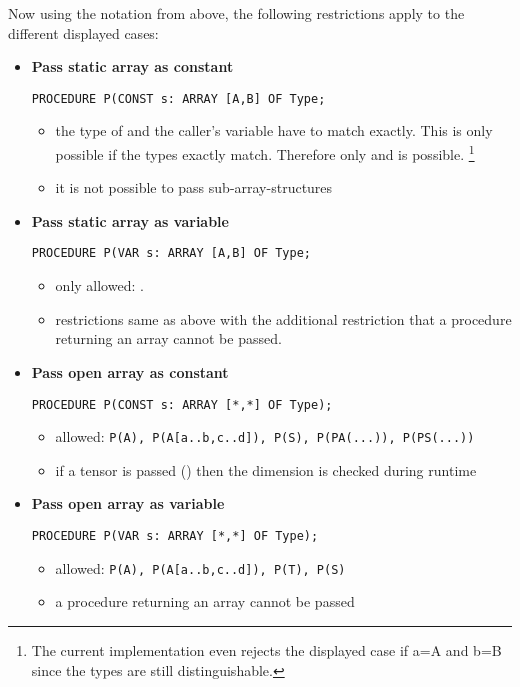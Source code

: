 \documentclass[a4wide,11pt]{article}
\newcommand{\pc}[1]{\makebox{\tt#1}}
\begin{document}
Now using the notation from above, the following restrictions apply to the different displayed cases:
\begin{itemize}
\item {\bf Pass static array as constant}
\begin{lstlisting}[style=example]
PROCEDURE P(CONST s: ARRAY [A,B] OF Type;
\end{lstlisting}
\begin{itemize}
\item the type of \pc{s} and the caller's variable have to match exactly.
This is only possible if the types exactly match.
Therefore only \pc{P(S)} and \pc{P(PS(...))} is possible. \footnote{The current implementation even rejects the displayed case if a=A and b=B  since the types are still distinguishable.}
\item it is not possible to pass sub-array-structures
\end{itemize}
\item {\bf Pass static array as variable}
\begin{lstlisting}[style=example]
PROCEDURE P(VAR s: ARRAY [A,B] OF Type;
\end{lstlisting}
\begin{itemize}
\item only allowed: \pc{P(S)}.
\item restrictions same as above with the additional restriction that a procedure returning an array cannot be passed.
\end{itemize}
\item {\bf Pass open array as constant}
\begin{lstlisting}[style=example]
PROCEDURE P(CONST s: ARRAY [*,*] OF Type);
\end{lstlisting}
\begin{itemize}
\item allowed: \lstinline"P(A), P(A[a..b,c..d]), P(S), P(PA(...)), P(PS(...))"
\item if a tensor is passed (\pc{P(T), P(PT(...))}) then the dimension is checked during runtime
\end{itemize}
\item {\bf Pass open array as variable}
\begin{lstlisting}[style=example]
PROCEDURE P(VAR s: ARRAY [*,*] OF Type);
\end{lstlisting}
\begin{itemize}
\item allowed: \lstinline"P(A), P(A[a..b,c..d]), P(T), P(S)"
\item a procedure returning an array cannot be passed

\end{itemize}
\end{itemize}
\end{document}
